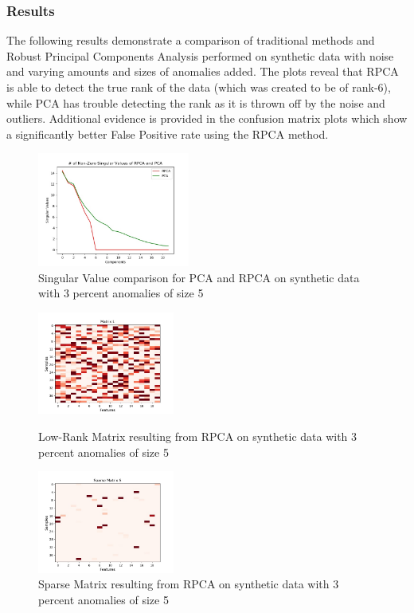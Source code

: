\documentclass{article}
\begin{document}
\subsubsection{Results}
The following results demonstrate a comparison of traditional methods and Robust Principal Components Analysis performed on synthetic data with noise and varying amounts and sizes of anomalies added.  The plots reveal that RPCA is able to detect the true rank of the data (which was created to be of rank-6), while PCA has trouble detecting the rank as it is thrown off by the noise and outliers.  Additional evidence is provided in the confusion matrix plots which show a significantly better False Positive rate using the RPCA method.


\begin{figure}[H]
    \centering
    \includegraphics[width=50mm, scale=0.5]{Singular_Value_Plot_Test_120AnomSize5.jpg}
    \caption{Singular Value comparison for PCA and RPCA on synthetic data with 3 percent anomalies of size 5}
    \label{fig:singvaltrain1205}
\end{figure}
\begin{figure}[H]
\begin{minipage}[b]{0.45\linewidth}
    \centering
    \includegraphics[width=45mm, scale=0.5]{L_120AnomSize5.jpg}
    \caption{Low-Rank Matrix resulting from RPCA on synthetic data with 3 percent anomalies of size 5}
    \label{fig:Ltrain1205}
\end{minipage}
\quad
\begin{minipage}[b]{0.45\linewidth}
    \includegraphics[width=45mm, scale=0.5]{S_120AnomSize5.jpg}
    \caption{Sparse Matrix resulting from RPCA on synthetic data with 3 percent anomalies of size 5}
    \label{fig:Strain1205}
\end{minipage}
\end{figure}
\end{document}
